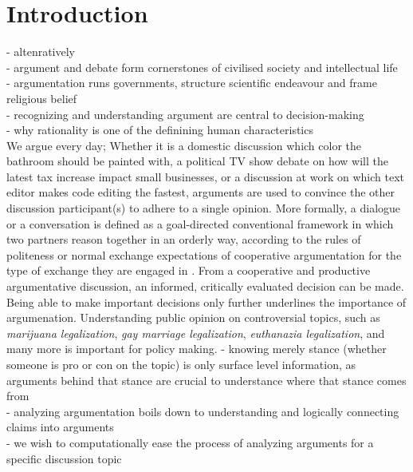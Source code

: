 \chapter{Introduction}

- altenratively \\
- argument and debate form cornerstones of civilised society and 
intellectual life \\
- argumentation runs governments, structure scientific endeavour and 
frame religious belief \\
- recognizing and understanding argument are central to decision-making \\
- why rationality is one of the definining human characteristics \\

We argue every day;
Whether it is a domestic discussion which color the bathroom should 
be painted with, a political TV show debate on how will the latest tax increase 
impact small businesses, or a discussion at work on which text editor makes
code editing the fastest, arguments are used to convince the other discussion 
participant(s) to adhere to a single opinion.
More formally, a dialogue or a conversation is defined as a goal-directed
conventional framework in which two partners reason 
together in an orderly way, 
according to the rules of politeness or normal exchange expectations
of cooperative argumentation for the type of exchange they are
engaged in \citep{walton1998new}. 
From a cooperative and productive argumentative discussion, 
an informed, critically evaluated decision can be made. 
Being able to make important decisions only further 
underlines the importance of argumenation. 
Understanding public opinion on controversial topics, such as 
\textit{marijuana legalization}, \textit{gay marriage legalization}, 
\textit{euthanazia legalization}, and many more is important for
policy making. 
- knowing merely stance (whether someone is pro or con on the topic)
is only surface level information, as arguments behind that stance are
crucial to understance where that stance comes from \\
- analyzing argumentation boils down to understanding and logically connecting
claims into arguments \\
- we wish to computationally ease the process of analyzing arguments for a 
specific discussion topic \\


